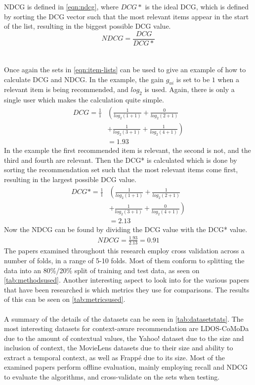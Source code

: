 NDCG is defined in \autoref{eqn:ndcg}, where $DCG*$ is the ideal DCG, which is defined by sorting the DCG vector such that the most relevant items appear in the start of the list\cite{dcgpaper}, resulting in the biggest possible DCG value.
\begin{equation}
    \label{eqn:ndcg}
    NDCG = \frac{DCG}{DCG*}
\end{equation}
\\\\
Once again the sets in \autoref{eqn:item-lists} can be used to give an example of how to calculate DCG and NDCG.
In the example, the gain $g_{ui}$ is set to be $1$ when a relevant item is being recommended, and $log_2$ is used.
Again, there is only a single user which makes the calculation quite simple.
\begin{align*}
    DCG = \frac{1}{1} &\left (\frac{1}{log_2 (1+1)} + \frac{0}{log_2 (2+1)} \right.\\
    & \left.+ \frac{1}{log_2 (3+1)} + \frac{1}{log_2 (4+1)}\right) \\
    & = 1.93
\end{align*}
In the example the first recommended item is relevant, the second is not, and the third and fourth are relevant.
Then the DCG* is calculated which is done by sorting the recommendation set such that the most relevant items come first, resulting in the largest possible DCG value.
\begin{align*}
    DCG* = \frac{1}{1} &\left (\frac{1}{log_2 (1+1)} + \frac{1}{log_2 (2+1)} \right.\\
    & \left.+ \frac{1}{log_2 (3+1)} + \frac{0}{log_2 (4+1)}\right) \\
    & = 2.13
\end{align*}
Now the NDCG can be found by dividing the DCG value with the DCG* value.
\begin{align*}
    NDCG = \frac{1.93}{2.13} = 0.91
\end{align*}
The papers examined throughout this research employ cross validation across a number of folds, in a range of 5-10 folds.
Most of them conform to splitting the data into an 80\%/20\% split of training and test data, as seen on \autoref{tab:methodsused}.
Another interesting aspect to look into for the various papers that have been researched is which metrics they use for comparisons.
The results of this can be seen on \autoref{tab:metricsused}.
\\\\
A summary of the details of the datasets can be seen in \autoref{tab:datasetstats}.
The most interesting datasets for context-aware recommendation are LDOS-CoMoDa due to the amount of contextual values, the Yahoo! dataset due to the size and inclusion of context, the MovieLens datasets due to their size and ability to extract a temporal context, as well as Frappé due to its size.
Most of the examined papers perform offline evaluation, mainly employing recall and NDCG to evaluate the algorithms, and cross-validate on the sets when testing.


